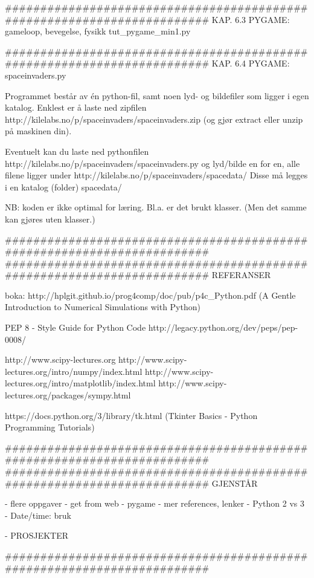 \documentclass[a4paper,11pt,utf8]{book}
\begin{document}
######################################################################## 
KAP. 6.3  PYGAME: gameloop, bevegelse, fysikk
tut_pygame_min1.py



######################################################################## 
KAP. 6.4  PYGAME: spaceinvaders.py 

Programmet består av én python-fil, samt noen lyd- og bildefiler 
som ligger i egen katalog. 
Enklest er å laste ned zipfilen 
http://kilelabs.no/p/spaceinvaders/spaceinvaders.zip 
(og gjør extract eller unzip på maskinen din). 

Eventuelt kan du laste ned pythonfilen 
http://kilelabs.no/p/spaceinvaders/spaceinvaders.py
og lyd/bilde en for en, alle filene ligger under
http://kilelabs.no/p/spaceinvaders/spacedata/
Disse må legges i en katalog (folder) spacedata/

NB: koden er ikke optimal for læring. 
Bl.a. er det brukt klasser. 
(Men det samme kan gjøres uten klasser.) 






######################################################################## 
######################################################################## 
REFERANSER

boka: http://hplgit.github.io/prog4comp/doc/pub/p4c_Python.pdf
(A Gentle Introduction to Numerical Simulations with Python)

PEP 8 - Style Guide for Python Code
http://legacy.python.org/dev/peps/pep-0008/ 

http://www.scipy-lectures.org
http://www.scipy-lectures.org/intro/numpy/index.html
http://www.scipy-lectures.org/intro/matplotlib/index.html
http://www.scipy-lectures.org/packages/sympy.html

https://docs.python.org/3/library/tk.html (Tkinter Basics - Python Programming Tutorials)


########################################################################
########################################################################
GJENSTÅR 

- flere oppgaver
- get from web
- pygame 
- mer references, lenker
- Python 2 vs 3 
- Date/time: bruk 

- PROSJEKTER 

########################################################################
\end{document}
